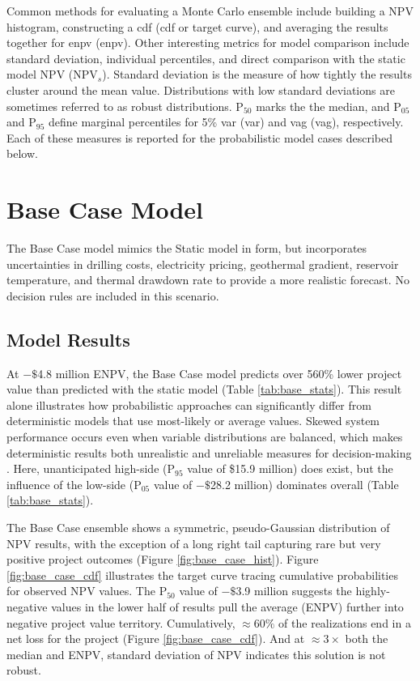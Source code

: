 Common methods for evaluating a Monte Carlo ensemble include building a NPV histogram, constructing a \acrlong{cdf} (\acrshort{cdf} or target curve), and averaging the results together for \acrlong{enpv} (\acrshort{enpv}). Other interesting metrics for model comparison include standard deviation, individual percentiles, and direct comparison with the static model NPV (NPV$_{s}$). Standard deviation is the measure of how tightly the results cluster around the mean value. Distributions with low standard deviations are sometimes referred to as robust distributions. P$_{50}$ marks the the median, and P$_{05}$ and P$_{95}$ define marginal percentiles for 5\% \acrlong{var} (\acrshort{var}) and \acrlong{vag} (\acrshort{vag}), respectively. Each of these measures is reported for the probabilistic model cases described below.

\section{Base Case Model}\label{ch6:base_case}

The Base Case model mimics the Static model in form, but incorporates uncertainties in drilling costs, electricity pricing, geothermal gradient, reservoir temperature, and thermal drawdown rate to provide a more realistic forecast. No decision rules are included in this scenario. 

\subsection{Model Results}\label{ch6:base_results}

At $-\$$4.8 million ENPV, the Base Case model predicts over 560\% lower project value than predicted with the static model (Table \ref{tab:base_stats}). This result alone illustrates how probabilistic approaches can significantly differ from deterministic models that use most-likely or average values. Skewed system performance occurs even when variable distributions are balanced, which makes deterministic results both unrealistic and unreliable measures for decision-making \citep[p.\ 48--49]{de_neufville_flexibility_2011}. Here, unanticipated high-side (P$_{95}$ value of \$15.9 million) does exist, but the influence of the low-side (P$_{05}$ value of $-\$$28.2 million) dominates overall (Table \ref{tab:base_stats}).

The Base Case ensemble shows a symmetric, pseudo-Gaussian distribution of NPV results, with the exception of a long right tail capturing rare but very positive project outcomes (Figure \ref{fig:base_case_hist}). Figure \ref{fig:base_case_cdf} illustrates the target curve tracing cumulative probabilities for observed NPV values. The P$_{50}$ value of $-\$$3.9 million suggests the highly-negative values in the lower half of results pull the average (ENPV) further into negative project value territory. Cumulatively, $\approx60\%$ of the realizations end in a net loss for the project (Figure \ref{fig:base_case_cdf}). And at $\approx3\times$ both the median and ENPV, standard deviation of NPV indicates this solution is not robust. 

